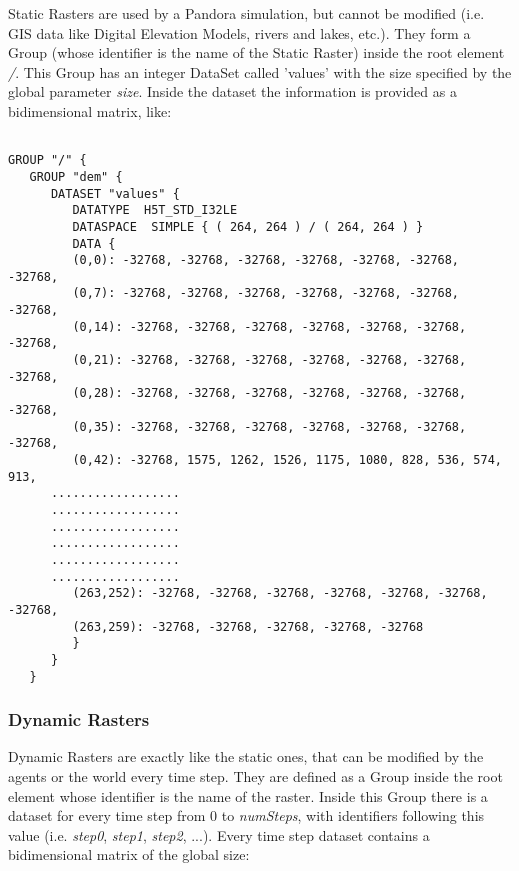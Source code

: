 \documentclass[a4paper,10pt]{article}
\begin{document}
Static Rasters are used by a Pandora simulation, but cannot be modified (i.e. GIS data like Digital Elevation Models, rivers and lakes, etc.).
They form a Group (whose identifier is the name of the Static Raster) inside the root element \textit{/}. This Group has an integer DataSet called 'values' with the size specified by the global parameter \textit{size}. Inside the dataset the information is provided as a bidimensional matrix, like:
\begin{verbatim}
 
GROUP "/" {
   GROUP "dem" {
      DATASET "values" {
         DATATYPE  H5T_STD_I32LE
         DATASPACE  SIMPLE { ( 264, 264 ) / ( 264, 264 ) }
         DATA {
         (0,0): -32768, -32768, -32768, -32768, -32768, -32768, -32768,
         (0,7): -32768, -32768, -32768, -32768, -32768, -32768, -32768,
         (0,14): -32768, -32768, -32768, -32768, -32768, -32768, -32768,
         (0,21): -32768, -32768, -32768, -32768, -32768, -32768, -32768,
         (0,28): -32768, -32768, -32768, -32768, -32768, -32768, -32768,
         (0,35): -32768, -32768, -32768, -32768, -32768, -32768, -32768,
         (0,42): -32768, 1575, 1262, 1526, 1175, 1080, 828, 536, 574, 913,
	  ..................
	  ..................
	  ..................
	  ..................
	  ..................
	  ..................
         (263,252): -32768, -32768, -32768, -32768, -32768, -32768, -32768,
         (263,259): -32768, -32768, -32768, -32768, -32768
         }
      }
   }
\end{verbatim}

\subsubsection{Dynamic Rasters}

Dynamic Rasters are exactly like the static ones, that can be modified by the agents or the world every time step. They are defined as a Group inside the root element whose identifier is the name of the raster. Inside this Group there is a dataset for every time step from 0 to \textit{numSteps}, with identifiers following this value (i.e. \textit{step0}, \textit{step1}, \textit{step2}, ...). Every time step dataset contains a bidimensional matrix of the global size:
\end{document}
